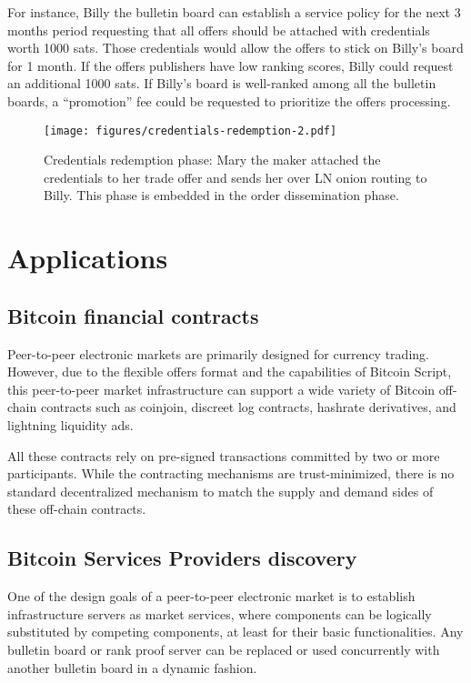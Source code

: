 \documentclass[pdflatex,sn-mathphys]{sn-jnl}%
\theoremstyle{thmstyleone}%
\theoremstyle{thmstyletwo}%
\theoremstyle{thmstylethree}%
\begin{document}
For instance, Billy the bulletin board can establish a service policy for the next 3 months period requesting that all offers should be attached with credentials worth 1000 sats. Those credentials would allow the offers to stick on Billy’s board for 1 month. If the offers publishers have low ranking scores, Billy could request an additional 1000 sats. If Billy’s board is well-ranked among all the bulletin boards, a “promotion” fee could be requested to prioritize the offers processing.

\begin{figure}[h]
    \centering
    \texttt{[image: figures/credentials-redemption-2.pdf]}
    \caption{Credentials redemption phase: Mary the maker attached the credentials to her trade offer and sends her over LN onion routing to Billy. This phase is embedded in the order dissemination phase.}
    \label{fig:redemption}
\end{figure}

\section{Applications}

\subsection{Bitcoin financial contracts}

Peer-to-peer electronic markets are primarily designed for currency trading. However, due to the flexible offers format and the capabilities of Bitcoin Script, this peer-to-peer market infrastructure can support a wide variety of Bitcoin off-chain contracts such as coinjoin, discreet log contracts, hashrate derivatives, and lightning liquidity ads.

All these contracts rely on pre-signed transactions committed by two or more participants. While the contracting mechanisms are trust-minimized, there is no standard decentralized mechanism to match the supply and demand sides of these off-chain contracts.

\subsection{Bitcoin Services Providers discovery}

One of the design goals of a peer-to-peer electronic market is to establish infrastructure servers as market services, where components can be logically substituted by competing components, at least for their basic functionalities. Any bulletin board or rank proof server can be replaced or used concurrently with another bulletin board in a dynamic fashion.
\end{document}
